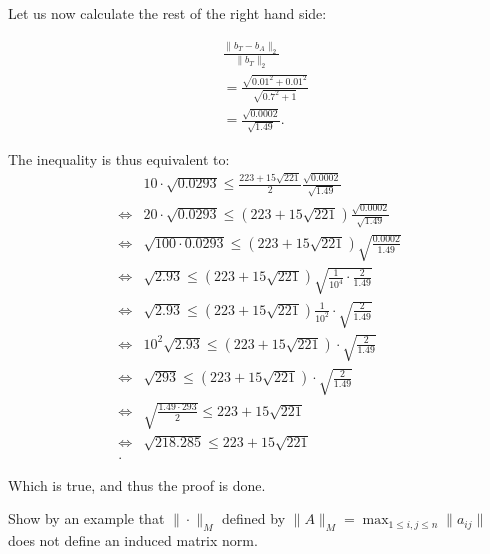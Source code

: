 \documentclass[10pt]{article}
\begin{document}
\begin{solution}[4]
Let us now calculate the rest of the right hand side:

\begin{align*}
 &  \frac{\| b_T - b_A \| _{2}}{\| b_T \| _{2}} \\
& = \frac{\sqrt{0.01 ^2 + 0.01 ^2}}{\sqrt{0.7 ^2 + 1}} \\
& = \frac{\sqrt{0.0002}}{\sqrt{1.49}} 
.
\end{align*}

The inequality is thus equivalent to:
\begin{align*}
 &  10 \cdot \sqrt{0.0293} \leq \frac{223 + 15 \sqrt{221}}{2} \frac{\sqrt{0.0002}}{\sqrt{1.49}} \\
\iff &  20 \cdot \sqrt{0.0293} \leq (223 + 15 \sqrt{221}) \frac{\sqrt{0.0002}}{\sqrt{1.49}} \\
\iff & \sqrt{100 \cdot 0.0293} \leq (223 + 15 \sqrt{221}) \sqrt{\frac{0.0002}{1.49} } \\
\iff & \sqrt{2.93} \leq (223 + 15 \sqrt{221}) \sqrt{\frac{1}{10^{4}} \cdot \frac{2}{1.49}} \\
\iff & \sqrt{2.93} \leq (223 + 15 \sqrt{221}) \frac{1}{10 ^2} \cdot \sqrt{\frac{2}{1.49}} \\
\iff & 10 ^2 \sqrt{2.93} \leq (223 + 15 \sqrt{221}) \cdot \sqrt{\frac{2}{1.49}} \\
\iff &  \sqrt{293} \leq (223 + 15 \sqrt{221}) \cdot \sqrt{\frac{2}{1.49}} \\
\iff &  \sqrt{\frac{1.49 \cdot293}{2}} \leq 223 + 15 \sqrt{221} \\
\iff &  \sqrt{218.285} \leq 223 + 15 \sqrt{221} \\
.
\end{align*}

Which is true, and thus the proof is done.
\end{solution}
\begin{exercise}[5]  \label{exe:5}
Show by an example that \(\| \cdot \| _{M}\) defined by
\(\| A \| _{M} = \max_{1\leq i,j \leq n} \| a _{ij} \|\) does not define an induced
matrix norm.
\end{exercise}
\end{document}
